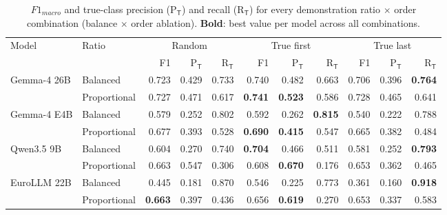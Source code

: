 \begin{table}[t]
\centering
\caption{$F1_{macro}$ and true-class precision (P$_\mathsf{T}$) and recall (R$_\mathsf{T}$) for every demonstration ratio $\times$ order combination (balance $\times$ order ablation). \textbf{Bold}: best value per model across all combinations.}
\label{tab:ablation-pr-grid}
\small
\setlength{\tabcolsep}{4pt}
\begin{tabular}{llrrrrrrrrr}
\toprule
Model & Ratio & \multicolumn{3}{c}{Random} & \multicolumn{3}{c}{True first} & \multicolumn{3}{c}{True last} \\
\cmidrule(lr){3-5} \cmidrule(lr){6-8} \cmidrule(lr){9-11}
 &  & F1 & P$_\mathsf{T}$ & R$_\mathsf{T}$ & F1 & P$_\mathsf{T}$ & R$_\mathsf{T}$ & F1 & P$_\mathsf{T}$ & R$_\mathsf{T}$ \\
\midrule
Gemma-4 26B & Balanced & 0.723 & 0.429 & 0.733 & 0.740 & 0.482 & 0.663 & 0.706 & 0.396 & \textbf{0.764} \\
 & Proportional & 0.727 & 0.471 & 0.617 & \textbf{0.741} & \textbf{0.523} & 0.586 & 0.728 & 0.465 & 0.641 \\
\addlinespace
Gemma-4 E4B & Balanced & 0.579 & 0.252 & 0.802 & 0.592 & 0.262 & \textbf{0.815} & 0.540 & 0.222 & 0.788 \\
 & Proportional & 0.677 & 0.393 & 0.528 & \textbf{0.690} & \textbf{0.415} & 0.547 & 0.665 & 0.382 & 0.484 \\
\addlinespace
Qwen3.5 9B & Balanced & 0.604 & 0.270 & 0.740 & \textbf{0.704} & 0.466 & 0.511 & 0.581 & 0.252 & \textbf{0.793} \\
 & Proportional & 0.663 & 0.547 & 0.306 & 0.608 & \textbf{0.670} & 0.176 & 0.653 & 0.362 & 0.465 \\
\addlinespace
EuroLLM 22B & Balanced & 0.445 & 0.181 & 0.870 & 0.546 & 0.225 & 0.773 & 0.361 & 0.160 & \textbf{0.918} \\
 & Proportional & \textbf{0.663} & 0.397 & 0.436 & 0.656 & \textbf{0.619} & 0.270 & 0.653 & 0.337 & 0.583 \\
\bottomrule
\end{tabular}
\end{table}